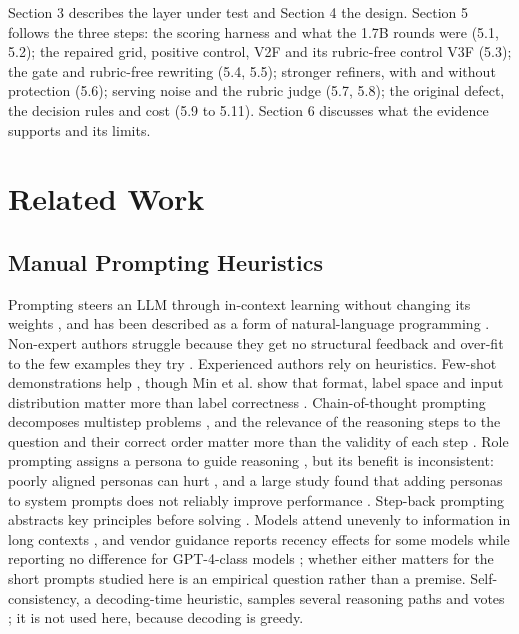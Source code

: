 \documentclass{ieeeaccess}
\begin{document}
Section 3 describes the layer under test and Section 4 the design. Section 5 follows the three steps: the scoring harness and what the 1.7B rounds were (5.1, 5.2); the repaired grid, positive control, V2F and its rubric-free control V3F (5.3); the gate and rubric-free rewriting (5.4, 5.5); stronger refiners, with and without protection (5.6); serving noise and the rubric judge (5.7, 5.8); the original defect, the decision rules and cost (5.9 to 5.11). Section 6 discusses what the evidence supports and its limits.

\section{Related Work}

\subsection{Manual Prompting Heuristics}

Prompting steers an LLM through in-context learning without changing its weights \cite{liu2023,brown2020}, and has been described as a form of natural-language programming \cite{reynolds2021}. Non-expert authors struggle because they get no structural feedback and over-fit to the few examples they try \cite{zamfirescupereira2023}. Experienced authors rely on heuristics. Few-shot demonstrations help \cite{brown2020,dong2024}, though Min et al. show that format, label space and input distribution matter more than label correctness \cite{min2022}. Chain-of-thought prompting decomposes multistep problems \cite{wei2022,kojima2022}, and the relevance of the reasoning steps to the question and their correct order matter more than the validity of each step \cite{wang2023}. Role prompting assigns a persona to guide reasoning \cite{kong2024}, but its benefit is inconsistent: poorly aligned personas can hurt \cite{kim2024}, and a large study found that adding personas to system prompts does not reliably improve performance \cite{zheng2024b}. Step-back prompting abstracts key principles before solving \cite{zheng2024}. Models attend unevenly to information in long contexts \cite{liu2024,yu2025}, and vendor guidance reports recency effects for some models while reporting no difference for GPT-4-class models \cite{microsoft2025}; whether either matters for the short prompts studied here is an empirical question rather than a premise. Self-consistency, a decoding-time heuristic, samples several reasoning paths and votes \cite{wang2023b}; it is not used here, because decoding is greedy.
\end{document}
